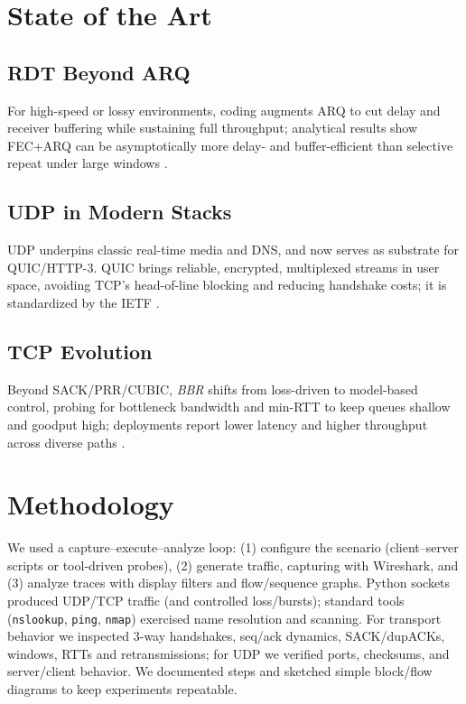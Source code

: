 
\section{State of the Art}

\subsection{RDT Beyond ARQ}
For high-speed or lossy environments, coding augments ARQ to cut delay and
receiver buffering while sustaining full throughput; analytical results show
FEC+ARQ can be asymptotically more delay- and buffer-efficient than selective
repeat under large windows \cite{ghaderi2013scalablerdt}.

\subsection{UDP in Modern Stacks}
UDP underpins classic real-time media and DNS, and now serves as substrate for
QUIC/HTTP-3. QUIC brings reliable, encrypted, multiplexed streams in user
space, avoiding TCP’s head-of-line blocking and reducing handshake costs; it is
standardized by the IETF \cite{rfc9000}.

\subsection{TCP Evolution}
Beyond SACK/PRR/CUBIC, \textit{BBR} shifts from loss-driven to model-based
control, probing for bottleneck bandwidth and min-RTT to keep queues shallow
and goodput high; deployments report lower latency and higher throughput across
diverse paths \cite{cardwell2017bbr}.

\section{Methodology}
We used a capture–execute–analyze loop: (1) configure the scenario
(client–server scripts or tool-driven probes), (2) generate traffic, capturing
with Wireshark, and (3) analyze traces with display filters and flow/sequence
graphs. Python sockets produced UDP/TCP traffic (and controlled loss/bursts);
standard tools (\texttt{nslookup}, \texttt{ping}, \texttt{nmap}) exercised name
resolution and scanning. For transport behavior we inspected 3-way handshakes,
seq/ack dynamics, SACK/dupACKs, windows, RTTs and retransmissions; for UDP we
verified ports, checksums, and server/client behavior. We documented steps and
sketched simple block/flow diagrams to keep experiments repeatable.

